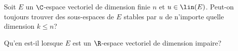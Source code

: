 \begin{enonce}
\begin{exercise}[ID={RMS 128 E655},subtitle={Mines-Ponts PSI 2017},tags={}, difficulty={0}]
  Soit $E$ un $\C$-espace vectoriel de dimension finie $n$ et $u\in\lin(E)$.
  Peut-on toujours trouver des sous-espaces de $E$ stables par $u$ de n'importe quelle dimension $k\leq n$?

  Qu'en est-il lorsque $E$ est un $\R$-espace vectoriel de dimension impaire?
\end{exercise}
\begin{solution}
\end{solution}
\end{enonce}
